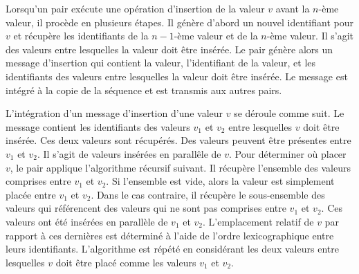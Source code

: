 Lorsqu'un pair exécute une opération d'insertion de la valeur $v$ avant la $n$-ème valeur, il procède en plusieurs étapes.
Il génère d'abord un nouvel identifiant pour $v$ et récupère les identifiants de la $n-1$-ème valeur et de la $n$-ème valeur.
Il s'agit des valeurs entre lesquelles la valeur doit être insérée.
Le pair génère alors un message d'insertion qui contient la valeur, l'identifiant de la valeur, et les identifiants des valeurs entre lesquelles la valeur doit être insérée.
Le message est intégré à la copie de la séquence et est transmis aux autres pairs.

L'intégration d'un message d'insertion d'une valeur $v$ se déroule comme suit.
Le message contient les identifiants des valeurs $v_1$ et $v_2$ entre lesquelles $v$ doit être insérée.
Ces deux valeurs sont récupérés.
Des valeurs peuvent être présentes entre $v_1$ et $v_2$.
Il s'agit de valeurs insérées en parallêle de $v$.
Pour déterminer où placer $v$, le pair applique l'algorithme récursif suivant.
Il récupère l'ensemble des valeurs comprises entre $v_1$ et $v_2$.
Si l'ensemble est vide, alors la valeur est simplement placée entre $v_1$ et $v_2$.
Dans le cas contraire, il récupère le sous-ensemble des valeurs qui référencent des valeurs qui ne sont pas comprises entre $v_1$ et $v_2$.
Ces valeurs ont été insérées en parallèle de $v_1$ et $v_2$.
L'emplacement relatif de $v$ par rapport à ces dernières est déterminé à l'aide de l'ordre lexicographique entre leurs identifiants.
L'algorithme est répété en considérant les deux valeurs entre lesquelles $v$ doit être placé comme les valeurs $v_1$ et $v_2$.

